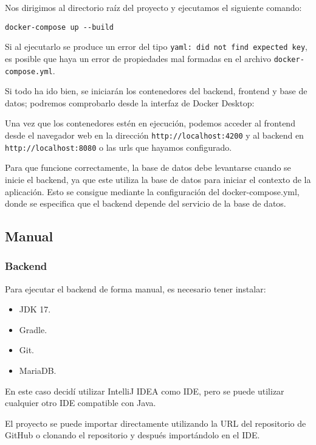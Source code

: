 Nos dirigimos al directorio raíz del proyecto y ejecutamos el siguiente comando:
\begin{verbatim}
docker-compose up --build
\end{verbatim}

Si al ejecutarlo se produce un error del tipo \texttt{yaml: did not find expected key}, es posible que haya un error de
propiedades mal formadas en el archivo \texttt{docker-compose.yml}.

Si todo ha ido bien, se iniciarán los contenedores del backend, frontend y base de datos; podremos comprobarlo desde la
interfaz de Docker Desktop:


Una vez que los contenedores estén en ejecución, podemos acceder al frontend desde el navegador web en la dirección
\texttt{http://localhost:4200} y al backend en \texttt{http://localhost:8080} o las urls que hayamos configurado.

Para que funcione correctamente, la base de datos debe levantarse cuando se inicie el backend, ya que este utiliza
la base de datos para iniciar el contexto de la aplicación.
Esto se consigue mediante la configuración del docker-compose.yml, donde se especifica que el backend depende del
servicio de la base de datos.

\subsection{Manual}

\subsubsection{Backend}

Para ejecutar el backend de forma manual, es necesario tener instalar:
\begin{itemize}
    \tightlist
    \item JDK 17.
    \item Gradle.
    \item Git.
    \item MariaDB\@.
\end{itemize}

En este caso decidí utilizar IntelliJ IDEA como IDE, pero se puede utilizar cualquier otro IDE compatible con Java.

El proyecto se puede importar directamente utilizando la URL del repositorio de GitHub o clonando el repositorio y
después importándolo en el IDE\@.

